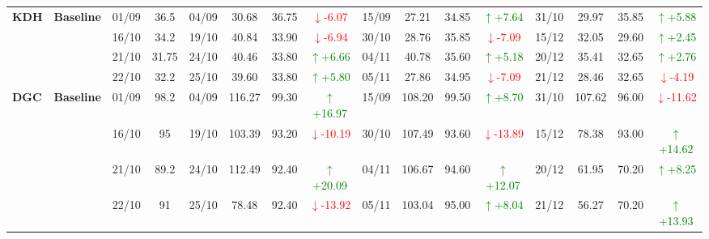 \documentclass{ieeeaccess}
\begin{document}
{\begin{longtable}{llcc|cccc|cccc|cccc}
\multirow{4}{*}{\textbf{KDH}}
& \textbf{Baseline}
& 01/09 & 36.5 & 04/09 & 30.68 & 36.75 & \textcolor{red}{\(\downarrow\)-6.07} & 15/09 & 27.21 & 34.85 & \textcolor{green}{\(\uparrow\)+7.64} & 31/10 & 29.97 & 35.85 & \textcolor{green}{\(\uparrow\)+5.88} \\
& & 16/10 & 34.2 & 19/10 & 40.84 & 33.90 & \textcolor{red}{\(\downarrow\)-6.94} & 30/10 & 28.76 & 35.85 & \textcolor{red}{\(\downarrow\)-7.09} & 15/12 & 32.05 & 29.60 & \textcolor{green}{\(\uparrow\)+2.45} \\
& & 21/10 & 31.75 & 24/10 & 40.46 & 33.80 & \textcolor{green}{\(\uparrow\)+6.66} & 04/11 & 40.78 & 35.60 & \textcolor{green}{\(\uparrow\)+5.18} & 20/12 & 35.41 & 32.65 & \textcolor{green}{\(\uparrow\)+2.76} \\
& & 22/10 & 32.2 & 25/10 & 39.60 & 33.80 & \textcolor{green}{\(\uparrow\)+5.80} & 05/11 & 27.86 & 34.95 & \textcolor{red}{\(\downarrow\)-7.09} & 21/12 & 28.46 & 32.65 & \textcolor{red}{\(\downarrow\)-4.19} \\
\midrule

\multirow{4}{*}{\textbf{DGC}}
& \textbf{Baseline}
& 01/09 & 98.2 & 04/09 & 116.27 & 99.30 & \textcolor{green}{\(\uparrow\)+16.97} & 15/09 & 108.20 & 99.50 & \textcolor{green}{\(\uparrow\)+8.70} & 31/10 & 107.62 & 96.00 & \textcolor{red}{\(\downarrow\)-11.62} \\
& & 16/10 & 95 & 19/10 & 103.39 & 93.20 & \textcolor{red}{\(\downarrow\)-10.19} & 30/10 & 107.49 & 93.60 & \textcolor{red}{\(\downarrow\)-13.89} & 15/12 & 78.38 & 93.00 & \textcolor{green}{\(\uparrow\)+14.62} \\
& & 21/10 & 89.2 & 24/10 & 112.49 & 92.40 & \textcolor{green}{\(\uparrow\)+20.09} & 04/11 & 106.67 & 94.60 & \textcolor{green}{\(\uparrow\)+12.07} & 20/12 & 61.95 & 70.20 & \textcolor{green}{\(\uparrow\)+8.25} \\
& & 22/10 & 91 & 25/10 & 78.48 & 92.40 & \textcolor{red}{\(\downarrow\)-13.92} & 05/11 & 103.04 & 95.00 & \textcolor{green}{\(\uparrow\)+8.04} & 21/12 & 56.27 & 70.20 & \textcolor{green}{\(\uparrow\)+13.93} \\
\midrule


\end{longtable}}
\end{document}
